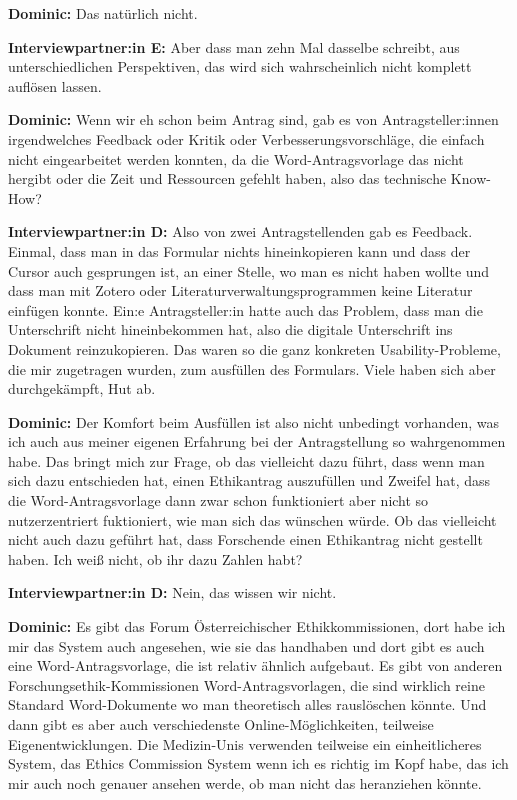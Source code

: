 \documentclass[a4paper,12pt,twoside,numbers=noendperiod]{scrreprt}
\begin{document}
\textbf{Dominic:} Das natürlich nicht.

\textbf{Interviewpartner:in E:} Aber dass man zehn Mal dasselbe schreibt, aus unterschiedlichen Perspektiven, das wird sich wahrscheinlich nicht komplett auflösen lassen.

\textbf{Dominic:} Wenn wir eh schon beim Antrag sind, gab es von Antragsteller:innen irgendwelches Feedback oder Kritik oder Verbesserungsvorschläge, die einfach nicht eingearbeitet werden konnten, da die Word-Antragsvorlage das nicht hergibt oder die Zeit und Ressourcen gefehlt haben, also das technische Know-How?

\textbf{Interviewpartner:in D:} Also von zwei Antragstellenden gab es Feedback. Einmal, dass man in das Formular nichts hineinkopieren kann und dass der Cursor auch gesprungen ist, an einer Stelle, wo man es nicht haben wollte und dass man mit Zotero oder Literaturverwaltungsprogrammen keine Literatur einfügen konnte. Ein:e Antragsteller:in hatte auch das Problem, dass man die Unterschrift nicht hineinbekommen hat, also die digitale Unterschrift ins Dokument reinzukopieren. Das waren so die ganz konkreten Usability-Probleme, die mir zugetragen wurden, zum ausfüllen des Formulars. Viele haben sich aber durchgekämpft, Hut ab.

\textbf{Dominic:} Der Komfort beim Ausfüllen ist also nicht unbedingt vorhanden, was ich auch aus meiner eigenen Erfahrung bei der Antragstellung so wahrgenommen habe. Das bringt mich zur Frage, ob das vielleicht dazu führt, dass wenn man sich dazu entschieden hat, einen Ethikantrag auszufüllen und Zweifel hat, dass die Word-Antragsvorlage dann zwar schon funktioniert aber nicht so nutzerzentriert fuktioniert, wie man sich das wünschen würde. Ob das vielleicht nicht auch dazu geführt hat, dass Forschende einen Ethikantrag nicht gestellt haben. Ich weiß nicht, ob ihr dazu Zahlen habt?

\textbf{Interviewpartner:in D:} Nein, das wissen wir nicht.

\textbf{Dominic:} Es gibt das Forum Österreichischer Ethikkommissionen, dort habe ich mir das System auch angesehen, wie sie das handhaben und dort gibt es auch eine Word-Antragsvorlage, die ist relativ ähnlich aufgebaut. Es gibt von anderen Forschungsethik-Kommissionen Word-Antragsvorlagen, die sind wirklich reine Standard Word-Dokumente wo man theoretisch alles rauslöschen könnte. Und dann gibt es aber auch verschiedenste Online-Möglichkeiten, teilweise Eigenentwicklungen. Die Medizin-Unis verwenden teilweise ein einheitlicheres System, das Ethics Commission System wenn ich es richtig im Kopf habe, das ich mir auch noch genauer ansehen werde, ob man nicht das heranziehen könnte.
\end{document}
